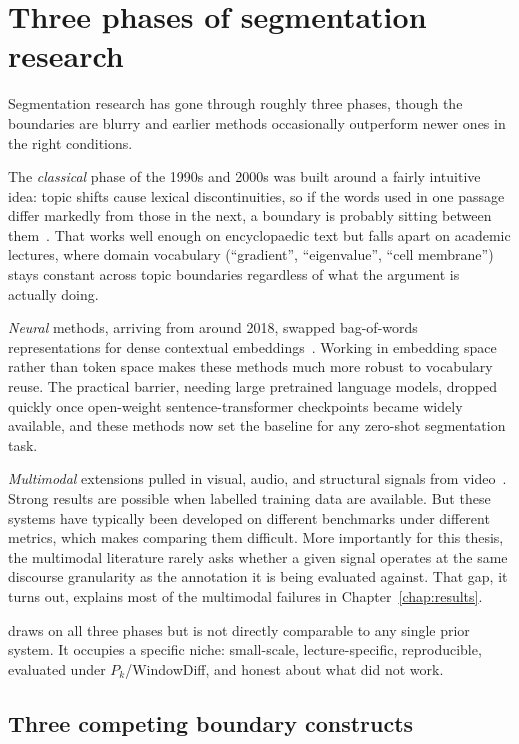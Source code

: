 \section{Three phases of segmentation research}

Segmentation research has gone through roughly three phases, though the
boundaries are blurry and earlier methods occasionally outperform newer ones
in the right conditions.

The \emph{classical} phase of the 1990s and 2000s was built around a fairly
intuitive idea: topic shifts cause lexical discontinuities, so if the words
used in one passage differ markedly from those in the next, a boundary
is probably sitting between
them~\cite{hearst1994multi,choi2000latent}. That works well enough on
encyclopaedic text but falls apart on academic lectures, where domain
vocabulary (``gradient'', ``eigenvalue'', ``cell membrane'') stays constant
across topic boundaries regardless of what the argument is actually doing.

\emph{Neural} methods, arriving from around 2018, swapped bag-of-words
representations for dense contextual
embeddings~\cite{koshorek2018text,reimers2019sbert}. Working in embedding space
rather than token space makes these methods much more robust to vocabulary
reuse. The practical barrier, needing large pretrained language models, dropped
quickly once open-weight sentence-transformer checkpoints became widely
available, and these methods now set the baseline for any zero-shot
segmentation task.

\emph{Multimodal} extensions pulled in visual, audio, and structural signals
from video~\cite{yu2024_multimodal,cao2022_chaptergen,yang2023_vidchapters}.
Strong results are possible when labelled training data are available. But
these systems have typically been developed on different benchmarks under
different metrics, which makes comparing them difficult. More importantly for
this thesis, the multimodal literature rarely asks whether a given signal
operates at the same discourse granularity as the annotation it is being
evaluated against. That gap, it turns out, explains most of the multimodal
failures in Chapter~\ref{chap:results}.

\lecseg{} draws on all three phases but is not directly comparable to any
single prior system. It occupies a specific niche: small-scale, lecture-specific,
reproducible, evaluated under $P_k$/WindowDiff, and honest about what
did not work.

\subsection{Three competing boundary constructs}
\label{sec:topic_def}

